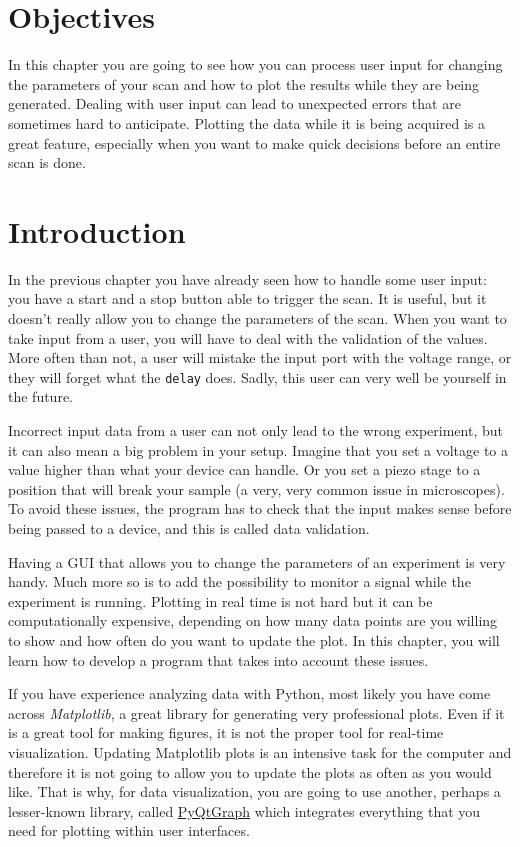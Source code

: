 \section{Objectives}
In this chapter you are going to see how you can process user input for
changing the parameters of your scan and how to plot the results while
they are being generated. Dealing with user input can lead to unexpected
errors that are sometimes hard to anticipate. Plotting the data while it
is being acquired is a great feature, especially when you want to make
quick decisions before an entire scan is done.

\section{Introduction}
In the previous chapter you have already seen how to handle some user
input: you have a start and a stop button able to trigger the scan. It
is useful, but it doesn't really allow you to change the parameters of
the scan. When you want to take input from a user, you will have to deal
with the validation of the values. More often than not, a user will
mistake the input port with the voltage range, or they will forget what
the \texttt{delay} does. Sadly, this user can very well be yourself in
the future.

Incorrect input data from a user can not only lead to the wrong
experiment, but it can also mean a big problem in your setup. Imagine that
you set a voltage to a value higher than what your device can handle. Or
you set a piezo stage to a position that will break your sample (a very,
very common issue in microscopes). To avoid these issues, the program
has to check that the input makes sense before being passed to a device,
and this is called data validation.

Having a {GUI} that allows you to change the parameters of an experiment
is very handy. Much more so is to add the possibility to monitor a
signal while the experiment is running. Plotting in real time is not
hard but it can be computationally expensive, depending on how many data
points are you willing to show and how often do you want to update the
plot. In this chapter, you will learn how to develop a program that
takes into account these issues.

If you have experience analyzing data with Python, most likely you have
come across \emph{Matplotlib}, a great library for generating very
professional plots. Even if it is a great tool for making
figures, it is not the proper tool for real-time visualization. Updating
Matplotlib plots is an intensive task for the computer and therefore it
is not going to allow you to update the plots as often as you would
like. That is why, for data visualization, you are going to use another,
perhaps a lesser-known library, called
\href{http://www.pyqtgraph.org/}{PyQtGraph} which integrates everything
that you need for plotting within user interfaces.

